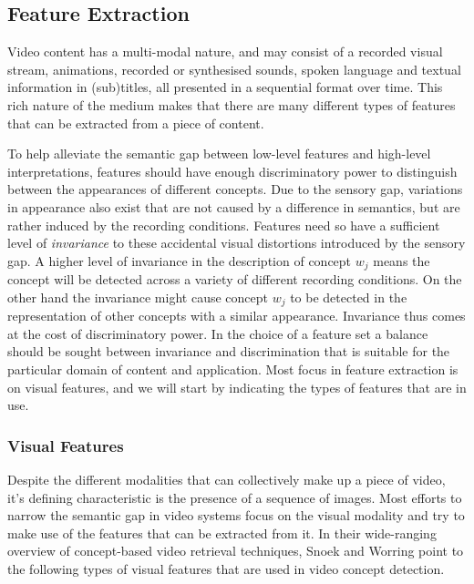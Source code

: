 \subsection{Feature Extraction}

Video content has a multi-modal nature, and may consist of a recorded visual stream, animations, recorded or synthesised sounds, spoken language and textual information in (sub)titles, all presented in a sequential format over time. This rich nature of the medium makes that there are many different types of features that can be extracted from a piece of content. 

To help alleviate the semantic gap between low-level features and high-level interpretations, features should have enough discriminatory power to distinguish between the appearances of different concepts. Due to the sensory gap, variations in appearance also exist that are not caused by a difference in semantics, but are rather induced by the recording conditions. Features need so have a sufficient level of \emph{invariance} to these accidental visual distortions introduced by the sensory gap\cite{Smeulders:2000tx}. A higher level of invariance in the description of concept $w_j$ means the concept will be detected across a variety of different recording conditions. On the other hand the invariance might cause concept $w_j$ to be detected in the representation of other concepts with a similar appearance. Invariance thus comes at the cost of discriminatory power. In the choice of a feature set a balance should be sought between invariance and discrimination that is suitable for the particular domain of content and application. Most focus in feature extraction is on visual features, and we will start by indicating the types of features that are in use.

\subsubsection{Visual Features}
Despite the different modalities that can collectively make up a piece of video, it's defining characteristic is the presence of a sequence of images. Most efforts to narrow the semantic gap in video systems focus on the visual modality and try to make use of the features that can be extracted from it. In their wide-ranging overview of concept-based video retrieval techniques, Snoek and Worring point to the following types of visual features that are used in video concept detection\cite{Snoek:2009dq}.

